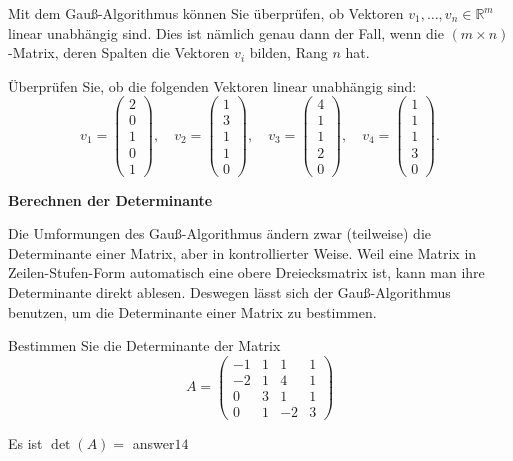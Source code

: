 \documentclass{ximera}
\begin{document}
Mit dem Gauß-Algorithmus können Sie überprüfen, ob Vektoren $v_1, \dots, v_n \in\mathbb R^m$ linear unabhängig sind. Dies ist nämlich genau dann der Fall, wenn die $(m\times n)$-Matrix, deren Spalten die Vektoren $v_i$ bilden, Rang $n$ hat.

\begin{question}
    Überprüfen Sie, ob die folgenden Vektoren linear unabhängig sind:
\[
v_1 = \left(
\begin{array}{c}
   2 \\ 0 \\ 1 \\ 0 \\ 1
\end{array}
\right), \quad
v_2 = \left(
\begin{array}{c}
   1 \\ 3 \\ 1 \\ 1 \\ 0
\end{array}
\right), \quad
v_3 = \left(
\begin{array}{c}
   4 \\ 1 \\ 1 \\ 2 \\ 0
\end{array}
\right), \quad
v_4 = \left(
\begin{array}{c}
   1 \\ 1 \\ 1 \\ 3 \\ 0
\end{array}
\right).
\]
\begin{solution}
\begin{multiple-choice}
\end{multiple-choice}
\end{solution}
\end{question}


\textbf{Berechnen der Determinante}

Die Umformungen des Gauß-Algorithmus ändern zwar (teilweise) die Determinante einer Matrix, aber in kontrollierter Weise. Weil eine Matrix in Zeilen-Stufen-Form automatisch eine obere Dreiecksmatrix ist, kann man ihre Determinante direkt ablesen. Deswegen lässt sich der Gauß-Algorithmus benutzen, um die Determinante einer Matrix zu bestimmen.

\begin{question}
    Bestimmen Sie die Determinante der Matrix
\[
A = \left(
\begin{array}{cccc}
 -1&1&1&1\\
 -2&1&4&1\\
 0&3&1&1 \\
 0&1&-2&3    
\end{array}
\right)
\]
\begin{solution}
Es ist $\det(A) =$ answer{$14$}
\end{solution}
\end{question}
\end{document}
